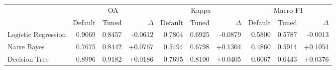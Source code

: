 \begin{tabular}{lrrrrrrrrr}
\toprule
 & \multicolumn{3}{c}{OA} & \multicolumn{3}{c}{Kappa} & \multicolumn{3}{c}{Macro F1} \\
\cmidrule(lr){2-4} \cmidrule(lr){5-7} \cmidrule(lr){8-10}
 & Default & Tuned & $\Delta$ & Default & Tuned & $\Delta$ & Default & Tuned & $\Delta$ \\
\midrule
Logistic Regression & 0.9069 & 0.8457 & -0.0612 & 0.7804 & 0.6925 & -0.0879 & 0.5800 & 0.5787 & -0.0013 \\
Naive Bayes & 0.7675 & 0.8442 & +0.0767 & 0.5494 & 0.6798 & +0.1304 & 0.4860 & 0.5914 & +0.1054 \\
Decision Tree & 0.8996 & 0.9182 & +0.0186 & 0.7695 & 0.8100 & +0.0405 & 0.6067 & 0.6443 & +0.0376 \\
\bottomrule
\end{tabular}
